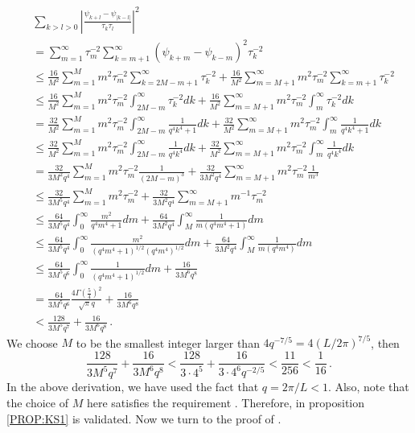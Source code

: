 \begin{align*}
  &\sum_{k>l>0}\left|\frac{\psi_{k+l} - \psi_{|k-l|}}{\tau_k\tau_l}\right|^2\\
  & = \sum_{m=1}^\infty \tau_m^{-2} \sum_{k=m+1}^\infty (\psi_{k+m} - \psi_{k-m})^2 
    \tau_k^{-2} \\
  & \le \frac{16}{M^2} \sum_{m=1}^M m^2\tau_m^{-2} \sum_{k=2M-m+1}^\infty 
    \tau_k^{-2} + 
    \frac{16}{M^2} \sum_{m=M+1}^\infty m^2\tau_m^{-2} \sum_{k=m+1}^\infty 
    \tau_k^{-2}     \\
  & \le \frac{16}{M^2} \sum_{m=1}^M m^2\tau_m^{-2} \int_{2M-m}^\infty 
    \tau_k^{-2} dk + 
    \frac{16}{M^2} \sum_{m=M+1}^\infty m^2\tau_m^{-2} \int_{m}^\infty 
    \tau_k^{-2} dk    \\
  & = \frac{32}{M^2} \sum_{m=1}^M m^2\tau_m^{-2} \int_{2M-m}^\infty 
    \frac{1}{q^4k^4+1} dk + 
    \frac{32}{M^2} \sum_{m=M+1}^\infty m^2\tau_m^{-2} \int_{m}^\infty 
    \frac{1}{q^4k^4+1} dk    \\
  & \le \frac{32}{M^2} \sum_{m=1}^M m^2\tau_m^{-2} \int_{2M-m}^\infty 
    \frac{1}{q^4k^4} dk + 
    \frac{32}{M^2} \sum_{m=M+1}^\infty m^2\tau_m^{-2} \int_{m}^\infty 
    \frac{1}{q^4k^4} dk    \\
  & = \frac{32}{3M^2q^4} \sum_{m=1}^M m^2\tau_m^{-2} \frac{1}{(2M-m)^3}+ 
    \frac{32}{3M^2q^4} \sum_{m=M+1}^\infty m^2\tau_m^{-2}
    \frac{1}{m^3}    \\
  & \le \frac{32}{3M^5q^4} \sum_{m=1}^M m^2\tau_m^{-2}  + 
    \frac{32}{3M^2q^4} \sum_{m=M+1}^\infty m^{-1}\tau_m^{-2}   \\
  & \le  \frac{64}{3M^5q^4} \int_{0}^\infty \frac{m^2}{q^4m^4+1} dm  + 
    \frac{64}{3M^2q^4} \int_{M}^\infty \frac{1}{m(q^4m^4+1)} dm  \\
  & \le  \frac{64}{3M^5q^4} \int_{0}^\infty 
    \frac{m^2}{(q^4m^4+1)^{1/2}(q^4m^4)^{1/2}} dm  + 
    \frac{64}{3M^2q^4} \int_{M}^\infty \frac{1}{m(q^4m^4)} dm  \\
  & \le  \frac{64}{3M^5q^6} \int_{0}^\infty 
    \frac{1}{(q^4m^4+1)^{1/2}} dm  + 
    \frac{16}{3M^6q^8} \\
  & = \frac{64}{3M^5q^6} \frac{4\Gamma(\frac{5}{4})^2}{\sqrt{\pi}q} +
    \frac{16}{3M^6q^8} \\
  & < \frac{128}{3M^5q^7}  + \frac{16}{3M^6q^8}
    \,.
\end{align*}
We choose $M$ to be the smallest integer larger than $4q^{-7/5} = 4(L/2\pi)^{7/5}$,
then
\[
  \frac{128}{3M^5q^7}  + \frac{16}{3M^6q^8} 
  < \frac{128}{3\cdot 4^5} + \frac{16}{3\cdot 4^6 q^{-2/5}}
  < \frac{11}{256} < \frac{1}{16}
  \,.
\]
In the above derivation, we have used the fact that $q = 2\pi/L < 1$.
Also, note that the choice of $M$ here satisfies the requirement 
.
Therefore,  in proposition \ref{PROP:KS1}
is validated. Now we turn to the proof of 
.

